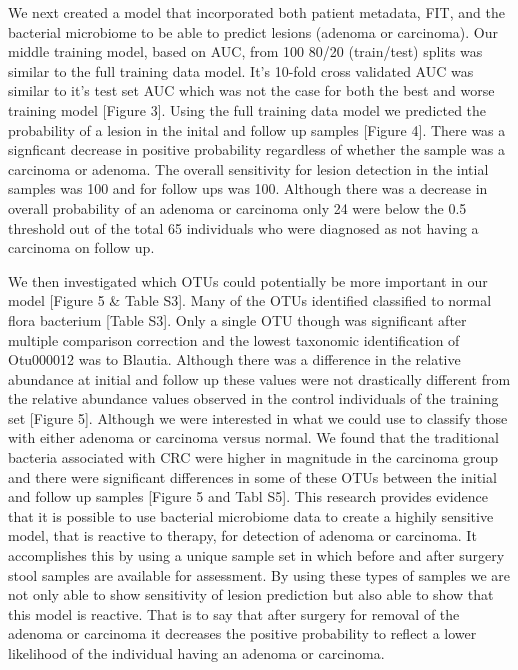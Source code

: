 \documentclass[12pt,]{article}
\begin{document}
We next created a model that incorporated both patient metadata, FIT,
and the bacterial microbiome to be able to predict lesions (adenoma or
carcinoma). Our middle training model, based on AUC, from 100 80/20
(train/test) splits was similar to the full training data model. It's
10-fold cross validated AUC was similar to it's test set AUC which was
not the case for both the best and worse training model {[}Figure 3{]}.
Using the full training data model we predicted the probability of a
lesion in the inital and follow up samples {[}Figure 4{]}. There was a
signficant decrease in positive probability regardless of whether the
sample was a carcinoma or adenoma. The overall sensitivity for lesion
detection in the intial samples was 100 and for follow ups was 100.
Although there was a decrease in overall probability of an adenoma or
carcinoma only 24 were below the 0.5 threshold out of the total 65
individuals who were diagnosed as not having a carcinoma on follow up.

We then investigated which OTUs could potentially be more important in
our model {[}Figure 5 \& Table S3{]}. Many of the OTUs identified
classified to normal flora bacterium {[}Table S3{]}. Only a single OTU
though was significant after multiple comparison correction and the
lowest taxonomic identification of Otu000012 was to Blautia. Although
there was a difference in the relative abundance at initial and follow
up these values were not drastically different from the relative
abundance values observed in the control individuals of the training set
{[}Figure 5{]}. Although we were interested in what we could use to
classify those with either adenoma or carcinoma versus normal. We found
that the traditional bacteria associated with CRC were higher in
magnitude in the carcinoma group and there were significant differences
in some of these OTUs between the initial and follow up samples
{[}Figure 5 and Tabl S5{]}. This research provides evidence that it is
possible to use bacterial microbiome data to create a highily sensitive
model, that is reactive to therapy, for detection of adenoma or
carcinoma. It accomplishes this by using a unique sample set in which
before and after surgery stool samples are available for assessment. By
using these types of samples we are not only able to show sensitivity of
lesion prediction but also able to show that this model is reactive.
That is to say that after surgery for removal of the adenoma or
carcinoma it decreases the positive probability to reflect a lower
likelihood of the individual having an adenoma or carcinoma.
\end{document}
